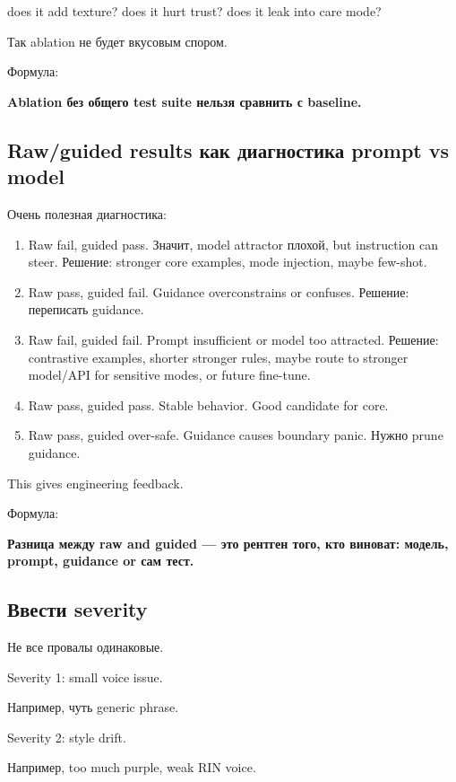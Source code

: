 does it add texture? does it hurt trust? does it leak into care mode?

Так ablation не будет вкусовым спором.

Формула:

\textbf{Ablation без общего test suite нельзя сравнить с baseline.}

\subsection*{Raw/\hspace{0pt}guided results как диагностика prompt vs model}

Очень полезная диагностика:

\begin{enumerate}
\def\labelenumi{\arabic{enumi}.}
\item
  Raw fail, guided pass. Значит, model attractor плохой, but instruction
  can steer. Решение: stronger core examples, mode injection, maybe
  few-shot.
\item
  Raw pass, guided fail. Guidance overconstrains or confuses. Решение:
  переписать guidance.
\item
  Raw fail, guided fail. Prompt insufficient or model too attracted.
  Решение: contrastive examples, shorter stronger rules, maybe route to
  stronger model/\hspace{0pt}API for sensitive modes, or future fine-tune.
\item
  Raw pass, guided pass. Stable behavior. Good candidate for core.
\item
  Raw pass, guided over-safe. Guidance causes boundary panic. Нужно
  prune guidance.
\end{enumerate}

This gives engineering feedback.

Формула:

\textbf{Разница между raw and guided --- это рентген того, кто виноват:
модель, prompt, guidance or сам тест.}

\subsection*{Ввести severity}

Не все провалы одинаковые.

Severity 1: small voice issue.

Например, чуть generic phrase.

Severity 2: style drift.

Например, too much purple, weak RIN voice.

